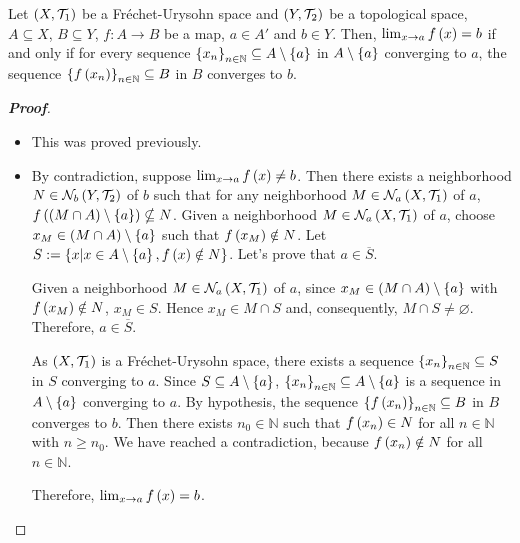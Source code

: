 \begin{proposition}\label{Characterization of limits of maps by sequences convergence}
  Let $\left(X,\mathcal{T}_1\right)$ be a Fréchet-Urysohn space and $\left(Y,\mathcal{T}_2\right)$ be a topological space, $A\subseteq X$, $B\subseteq Y$, $f:A\rightarrow B$ be a map, $a\in A'$ and $b\in Y$. Then, $\lim_{x\to a}{f\left(x\right)}=b$ if and only if for every sequence $\left\{x_n\right\}_{n\in\mathbb{N}}\subseteq A\setminus\left\{a\right\}$ in $A\setminus\left\{a\right\}$ converging to $a$, the sequence $\left\{f\left(x_n\right)\right\}_{n\in\mathbb{N}}\subseteq B$ in $B$ converges to $b$.
  \begin{proof}[\rm\textbf{Proof}]
    \hfill
    \begin{itemize}
      \item[\boxed{\Rightarrow}] This was proved previously.
      \item[\boxed{\Leftarrow}] By contradiction, suppose $\lim_{x\to a}{f\left(x\right)}\neq b$. Then there exists a neighborhood $N\in\mathcal{N}_b\left(Y,\mathcal{T}_2\right)$ of $b$ such that for any neighborhood $M\in\mathcal{N}_a\left(X,\mathcal{T}_1\right)$ of $a$, $f\left(\left(M\cap A\right)\setminus\left\{a\right\}\right)\nsubseteq N$. Given a neighborhood $M\in\mathcal{N}_a\left(X,\mathcal{T}_1\right)$ of $a$, choose $x_M\in\left(M\cap A\right)\setminus\left\{a\right\}$ such that $f\left(x_M\right)\notin N$. Let $S:=\left\{x\middle|x\in A\setminus\left\{a\right\},f\left(x\right)\notin N\right\}$. Let's prove that $a\in\overline{S}$.
      
      Given a neighborhood $M\in\mathcal{N}_a\left(X,\mathcal{T}_1\right)$ of $a$, since $x_M\in\left(M\cap A\right)\setminus\left\{a\right\}$ with $f\left(x_M\right)\notin N$, $x_M\in S$. Hence $x_M\in M\cap S$ and, consequently, $M\cap S\neq\varnothing$. Therefore, $a\in\overline{S}$.

      As $\left(X,\mathcal{T}_1\right)$ is a Fréchet-Urysohn space, there exists a sequence $\left\{x_n\right\}_{n\in\mathbb{N}}\subseteq S$ in $S$ converging to $a$. Since $S\subseteq A\setminus\left\{a\right\}$, $\left\{x_n\right\}_{n\in\mathbb{N}}\subseteq A\setminus\left\{a\right\}$ is a sequence in $A\setminus\left\{a\right\}$ converging to $a$. By hypothesis, the sequence $\left\{f\left(x_n\right)\right\}_{n\in\mathbb{N}}\subseteq B$ in $B$ converges to $b$. Then there exists $n_0\in\mathbb{N}$ such that $f\left(x_n\right)\in N$ for all $n\in\mathbb{N}$ with $n\geq n_0$. We have reached a contradiction, because $f\left(x_n\right)\notin N$ for all $n\in\mathbb{N}$.

      Therefore, $\lim_{x\to a}{f\left(x\right)}=b$.
    \end{itemize}
  \end{proof}
\end{proposition}